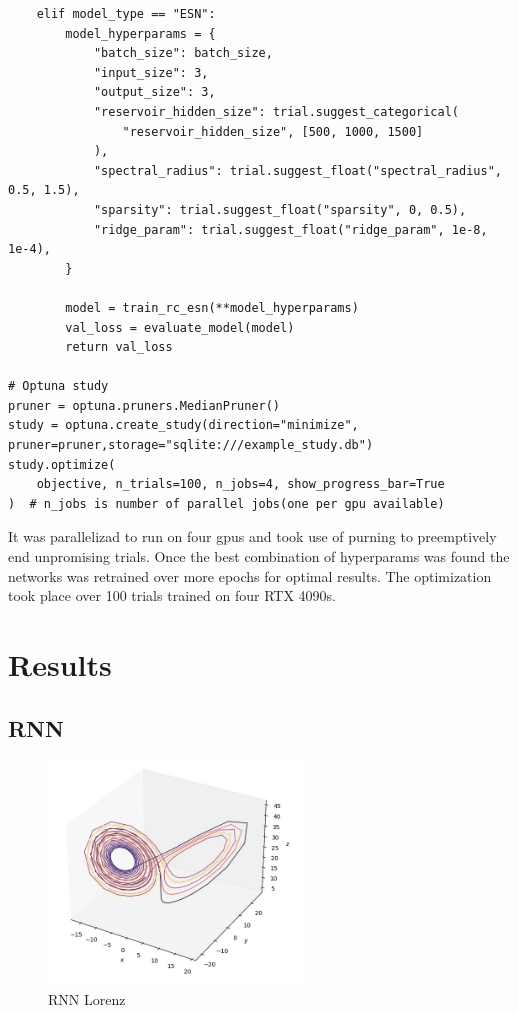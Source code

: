 \documentclass[11pt]{article}
\begin{document}
\begin{lstlisting}
    elif model_type == "ESN":
        model_hyperparams = {
            "batch_size": batch_size,
            "input_size": 3,
            "output_size": 3,
            "reservoir_hidden_size": trial.suggest_categorical(
                "reservoir_hidden_size", [500, 1000, 1500]
            ),
            "spectral_radius": trial.suggest_float("spectral_radius", 0.5, 1.5),
            "sparsity": trial.suggest_float("sparsity", 0, 0.5),
            "ridge_param": trial.suggest_float("ridge_param", 1e-8, 1e-4),
        }

        model = train_rc_esn(**model_hyperparams)
        val_loss = evaluate_model(model)
        return val_loss

# Optuna study
pruner = optuna.pruners.MedianPruner()
study = optuna.create_study(direction="minimize", pruner=pruner,storage="sqlite:///example_study.db")
study.optimize(
    objective, n_trials=100, n_jobs=4, show_progress_bar=True
)  # n_jobs is number of parallel jobs(one per gpu available)
\end{lstlisting}

It was parallelizad to run on four gpus and took use of purning to preemptively end unpromising trials. Once the best combination of hyperparams was found the networks was retrained over more epochs for optimal results. The optimization took place over 100 trials trained on four RTX 4090s.

\section{Results}
\subsection{RNN}

\begin{figure}[h]
\centering
\includegraphics[width=0.6\textwidth]{rnn_lorenz.jpeg}
\caption{RNN Lorenz}
\end{figure}
\end{document}
